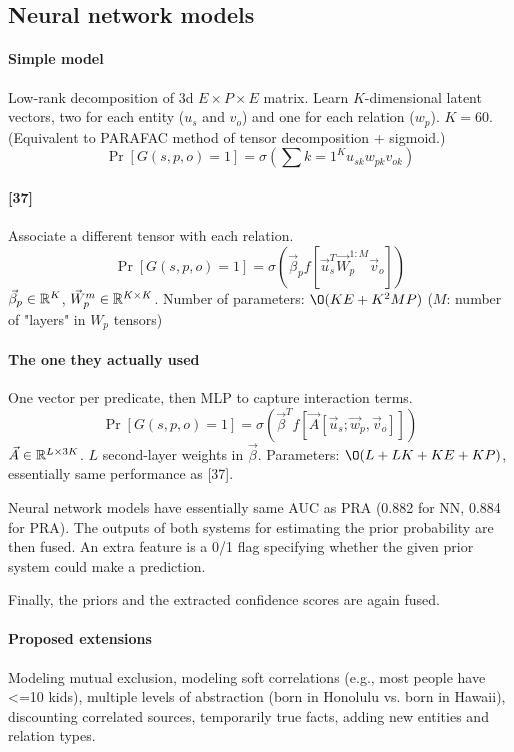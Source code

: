 \subsection{Neural network models}

\paragraph{Simple model}
Low-rank decomposition of 3d $E\times P\times E$ matrix. Learn $K$-dimensional
latent vectors, two for each entity ($u_s$ and $v_o$) and one for each relation
($w_p$). $K=60$. (Equivalent to PARAFAC method of tensor decomposition +
sigmoid.)
$$\Pr[G(s,p,o)=1] = \sigma(\sum\limits{k=1}^K u_{sk} w_{pk} v_{ok})$$

\paragraph{[37]}
Associate a different tensor with each relation.
$$\Pr[G(s,p,o)=1] = \sigma(\vec{\beta}_p f[\vec{u}_s^T \vec{W}_p^{1:M} \vec{v}_o])$$
$\vec{\beta}_p\in\mathbb{R}^K$, $\vec{W}_p^m\in\mathbb{R}^{K\times K}$.
Number of parameters: $\O(KE+K^2 MP)$ ($M$: number of "layers" in $W_p$ tensors)

\paragraph{The one they actually used}
One vector per predicate, then MLP to capture interaction terms.
$$\Pr[G(s,p,o)=1]=\sigma(\vec{\beta}^T f[\vec{A} [\vec{u}_s; \vec{w}_p, \vec{v}_o] ])$$
$\vec{A}\in\mathbb{R}^{L\times 3K}$.
$L$ second-layer weights in $\vec{\beta}$.
Parameters: $\O(L+LK+KE+KP)$, essentially same performance as [37].

Neural network models have essentially same AUC as PRA
(0.882 for NN, 0.884 for PRA).
The outputs of both systems for estimating the prior probability are then
fused. An extra feature is a 0/1 flag specifying whether the given prior system
could make a prediction.

Finally, the priors and the extracted confidence scores are again fused.

\paragraph{Proposed extensions}
Modeling mutual exclusion, modeling soft correlations
(e.g., most people have <=10 kids), multiple levels of abstraction (born in
Honolulu vs. born in Hawaii), discounting correlated sources, temporarily true
facts, adding new entities and relation types.

